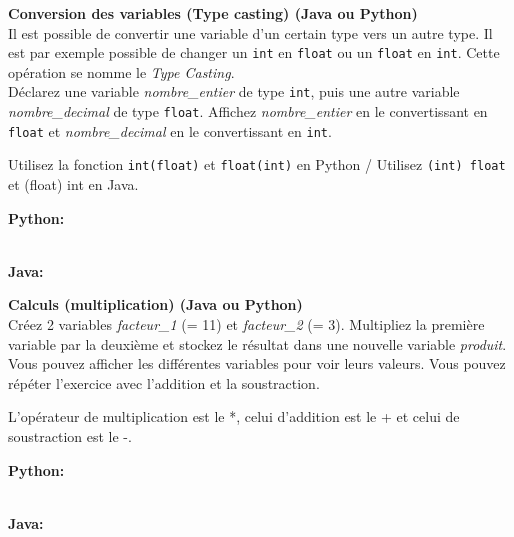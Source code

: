  \begin{Exercice}[5 minutes] \textbf{Conversion des variables (Type casting) (Java ou Python)}\\
    Il est possible de convertir une variable d'un certain type vers un autre type. Il est par exemple possible de changer un \lstinline{int} en \lstinline{float} ou un \lstinline{float} en \lstinline{int}. Cette opération se nomme le \textit{Type Casting}. \\
    Déclarez une variable \textit{nombre\_entier} de type \lstinline{int}, puis une autre variable \textit{nombre\_decimal} de type \lstinline{float}. Affichez \textit{nombre\_entier} en le convertissant en \lstinline{float} et \textit{nombre\_decimal} en le convertissant en \lstinline{int}. \\
    
     \begin{conseil}
        Utilisez la fonction \lstinline{int(float)} et \lstinline{float(int)} en Python / Utilisez \lstinline{(int) float} et (float) int en Java.
         
     \end{conseil}
     \begin{solution}
     
     \textbf{Python:}
     
     
     
     \textbf{\\Java:}
     
            
     \end{solution}   
 \end{Exercice}

 \begin{Exercice}[3 minutes] \textbf{Calculs (multiplication) (Java ou Python)}\\
 
    Créez 2 variables \textit{facteur\_1} (= 11) et \textit{facteur\_2} (= 3). Multipliez la première variable par la deuxième et stockez le résultat dans une nouvelle variable \textit{produit}. Vous pouvez afficher les différentes variables pour voir leurs valeurs. Vous pouvez répéter l'exercice avec l'addition et la soustraction. \\
    
     \begin{conseil}
           L'opérateur de multiplication est le *, celui d'addition est le + et celui de soustraction est le -.
         
     \end{conseil}
     \begin{solution}
     
     \textbf{Python:}
     
     
     \textbf{\\Java:}
     
            
     \end{solution}   
 \end{Exercice}
 
